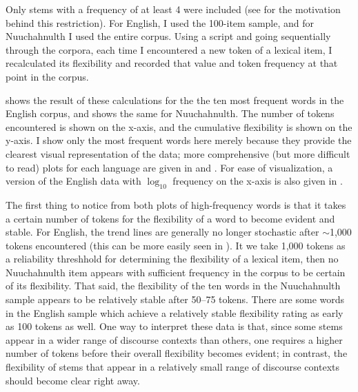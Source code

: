 Only stems with a frequency of at least 4 were included (see  for the motivation behind this restriction). For English, I used the 100-item sample, and for Nuuchahnulth I used the entire corpus. Using a script and going sequentially through the corpora, each time I encountered a new token of a lexical item, I recalculated its flexibility and recorded that value and token frequency at that point in the corpus.

 shows the result of these calculations for the the ten most frequent words in the English corpus, and  shows the same for Nuuchahnulth. The number of tokens encountered is shown on the x-axis, and the cumulative flexibility is shown on the y-axis. I show only the most frequent words here merely because they provide the clearest visual representation of the data; more comprehensive (but more difficult to read) plots for each language are given in  and . For ease of visualization, a version of the English data with $\log_{10}$ frequency on the x-axis is also given in .


The first thing to notice from both plots of high-frequency words is that it takes a certain number of tokens for the flexibility of a word to become evident and stable. For English, the trend lines are generally no longer stochastic after $\sim$1,000 tokens encountered (this can be more easily seen in ). It we take 1,000 tokens as a reliability threshhold for determining the flexibility of a lexical item, then no Nuuchahnulth item appears with sufficient frequency in the corpus to be certain of its flexibility. That said, the flexibility of the ten words in the Nuuchahnulth sample appears to be relatively stable after 50–75 tokens. There are some words in the English sample which achieve a relatively stable flexibility rating as early as 100 tokens as well. One way to interpret these data is that, since some stems appear in a wider range of discourse contexts than others, one requires a higher number of tokens before their overall flexibility becomes evident; in contrast, the flexibility of stems that appear in a relatively small range of discourse contexts should become clear right away.

